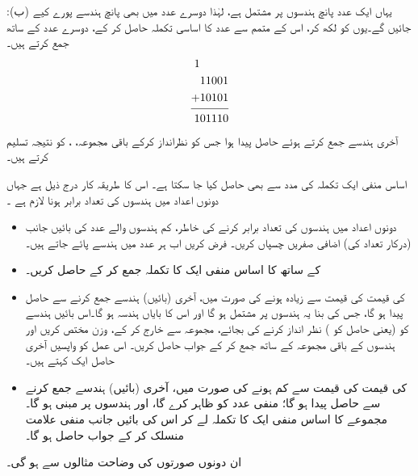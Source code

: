 :\quad  (ب) یہاں ایک عدد پانچ ہندسوں پر مشتمل  ہے،  لہٰذا دوسرے عدد  میں بھی  پانچ ہندسے پورے  کیے  جائیں گے۔یوں    کو  لکھ کر،  اس  کے   متمم 
  سے  عدد کا اساسی تکملہ  حاصل کر  کے،  دوسرے عدد کے ساتھ جمع کرتے ہیں۔
\begin{align*}
\begin{split}
1\phantom{11001}&\\
11001&\\
+10101&\\
\noalign{\smallskip}\hline\noalign{\smallskip}
101110&
\end{split}
\end{align*}
آخری ہندسے جمع کرتے ہوئے حاصل  پیدا ہوا جس کو نظرانداز کرکے  باقی مجموعہ،   ، کو نتیجہ  تسلیم کرتے  ہیں۔


اساس منفی ایک تکملہ  کی مدد سے بھی       حاصل کیا جا سکتا ہے۔ اس کا  طریقہ کار  درج ذیل ہے جہاں    دونوں اعداد میں ہندسوں کی تعداد برابر ہونا لازم ہے ۔
\begin{itemize}
    \item
     دونوں  اعداد میں ہندسوں کی تعداد   برابر  کرنے کی خاطر،  کم ہندسوں  والے   عدد کی بائیں جانب  (درکار تعداد کی) اضافی صفریں  چسپاں کریں۔ فرض کریں اب ہر عدد میں     ہندسے پائے جاتے ہیں۔ 
    \item
     کے ساتھ    کا اساس منفی ایک کا   تکملہ جمع کر کے       حاصل کریں۔
   \item
        کی قیمت    کی قیمت سے زیادہ ہونے کی صورت میں، آخری  (بائیں)  ہندسے جمع کرنے سے  حاصل   پیدا ہو  گا،        جس کی بنا  یہ    ہندسوں پر مشتمل  ہو گا اور اس کا  بایاں ہندسہ         ہو گا۔اس  بائیں ہندسے    کو (یعنی حاصل  کو )  نظر انداز کرنے کی بجائے،   مجموعہ سے خارج کر کے،   وزن مختص کریں اور   ہندسوں کے باقی مجموعہ کے ساتھ جمع کر کے جواب حاصل کریں۔ اس عمل کو واپسیں آخری حاصل ایک   کہتے ہیں۔
    \item
{}کی قیمت   کی قیمت سے کم  ہونے کی صورت میں،  آخری  (بائیں)  ہندسے جمع کرنے سے  حاصل   پیدا    ہو  گا؛        منفی عدد کو ظاہر کرے گا، اور  ہندسوں  پر مبنی ہو گا۔مجموعے کا اساس منفی ایک کا   تکملہ لے کر اس کی بائیں جانب  منفی علامت  منسلک  کر کے  جواب  حاصل ہو گا۔
\end{itemize}
ان  دونوں صورتوں کی وضاحت مثالوں  سے ہو  گی۔ 

